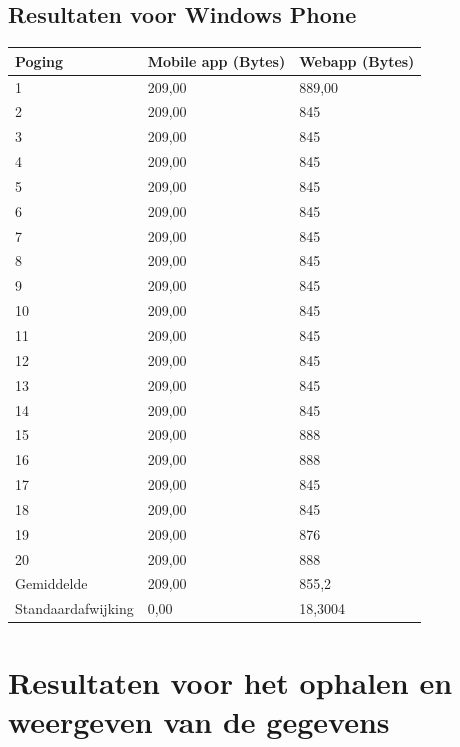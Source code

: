 \documentclass[pdftex,a4paper,12pt,twoside]{report}
\begin{document}
\subsection{Resultaten voor Windows Phone}
\begin{center}
  \begin{tabular}{ | l | l | l |}
      \hline
      Poging & Mobile app (Bytes) & Webapp (Bytes)
      \\ \hline
      1 & 209,00 & 889,00
      \\ \hline
      2 & 209,00 & 845
      \\ \hline
      3 & 209,00 & 845
      \\ \hline
      4 & 209,00 & 845
      \\ \hline
      5 & 209,00 & 845
      \\ \hline
      6 & 209,00 & 845
      \\ \hline
      7 & 209,00 & 845
      \\ \hline
      8 & 209,00 & 845
      \\ \hline
      9 & 209,00 & 845
      \\ \hline
      10 & 209,00 & 845
      \\ \hline
      11 & 209,00 & 845
      \\ \hline
      12 & 209,00 & 845
      \\ \hline
      13 & 209,00 & 845
      \\ \hline
      14 & 209,00 & 845
      \\ \hline
      15 & 209,00 & 888
      \\ \hline
      16 & 209,00 & 888
      \\ \hline
      17 & 209,00 & 845
      \\ \hline
      18 & 209,00 & 845
      \\ \hline
      19 & 209,00 & 876
      \\ \hline
      20 & 209,00 & 888
      \\ \hline
      Gemiddelde & 209,00 & 855,2
      \\ \hline
      Standaardafwijking & 0,00 & 18,3004
      \\ \hline
  \end{tabular}
\end{center}
\newpage
\section{Resultaten voor het ophalen en weergeven van de gegevens}
\end{document}

